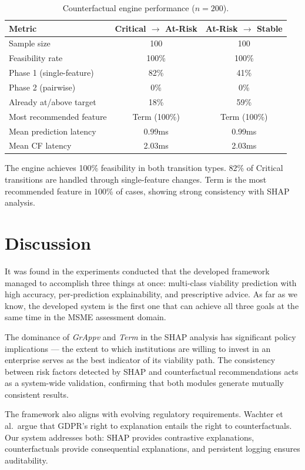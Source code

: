 \documentclass[12pt,a4paper]{report}
\begin{document}
\begin{table}[H]
\centering
\caption{Counterfactual engine performance ($n = 200$).}
\label{tab:cf_eval_report}
\begin{tabular}{lcc}
\hline
\textbf{Metric} & \textbf{Critical $\rightarrow$ At-Risk} & \textbf{At-Risk $\rightarrow$ Stable} \\
\hline
Sample size & 100 & 100 \\
Feasibility rate & 100\% & 100\% \\
Phase 1 (single-feature) & 82\% & 41\% \\
Phase 2 (pairwise) & 0\% & 0\% \\
Already at/above target & 18\% & 59\% \\
Most recommended feature & Term (100\%) & Term (100\%) \\
Mean prediction latency & 0.99ms & 0.99ms \\
Mean CF latency & 2.03ms & 2.03ms \\
\hline
\end{tabular}
\end{table}

The engine achieves 100\% feasibility in both transition types. 82\% of Critical transitions are handled through single-feature changes. Term is the most recommended feature in 100\% of cases, showing strong consistency with SHAP analysis.

\section{Discussion}

It was found in the experiments conducted that the developed framework managed to accomplish three things at once: multi-class viability prediction with high accuracy, per-prediction explainability, and prescriptive advice. As far as we know, the developed system is the first one that can achieve all three goals at the same time in the MSME assessment domain.

The dominance of \textit{GrAppv} and \textit{Term} in the SHAP analysis has significant policy implications --- the extent to which institutions are willing to invest in an enterprise serves as the best indicator of its viability path. The consistency between risk factors detected by SHAP and counterfactual recommendations acts as a system-wide validation, confirming that both modules generate mutually consistent results.

The framework also aligns with evolving regulatory requirements. Wachter et al.\ argue that GDPR's right to explanation entails the right to counterfactuals. Our system addresses both: SHAP provides contrastive explanations, counterfactuals provide consequential explanations, and persistent logging ensures auditability.
\end{document}
